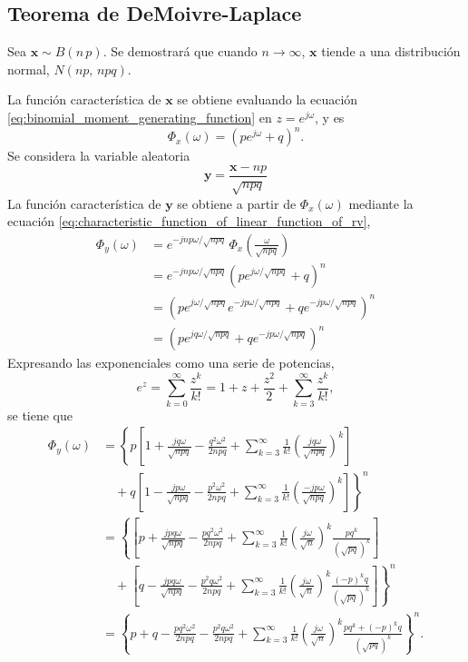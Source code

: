 \documentclass[a4paper]{report}
\newcommand{\x}{\mathbf{x}}
\newcommand{\y}{\mathbf{y}}
\begin{document}
\subsection{Teorema de DeMoivre-Laplace}

Sea \(\x\sim B(n\,p)\). Se demostrará que cuando \(n\to\infty\), \(\x\) tiende a una distribución normal, \(N(np,\,npq)\).

La función característica de \(\x\) se obtiene evaluando la ecuación \ref{eq:binomial_moment_generating_function} en \(z=e^{j\omega}\), y es
\[
 \Phi_x(\omega)=\left(pe^{j\omega}+q\right)^n.
\]
Se considera la variable aleatoria
\[
 \y=\frac{\x-np}{\sqrt{npq}}
\]
La función característica de \(\y\) se obtiene a partir de \(\Phi_x(\omega)\) mediante la ecuación \ref{eq:characteristic_function_of_linear_function_of_rv},
\begin{align*}
 \Phi_y(\omega)&=e^{-jnp\omega/\sqrt{npq}}\,\Phi_x\left(\frac{\omega}{\sqrt{npq}}\right)\\
   &=e^{-jnp\omega/\sqrt{npq}}\left(pe^{j\omega/\sqrt{npq}}+q\right)^n\\
   &=\left(pe^{j\omega/\sqrt{npq}}e^{-jp\omega/\sqrt{npq}}+qe^{-jp\omega/\sqrt{npq}}\right)^n\\
   &=\left(pe^{jq\omega/\sqrt{npq}}+qe^{-jp\omega/\sqrt{npq}}\right)^n
\end{align*}
Expresando las exponenciales como una serie de potencias, 
\[
 e^z=\sum_{k=0}^{\infty}\frac{z^{k}}{k!}=1+z+\frac{z^2}{2}+\sum_{k=3}^{\infty}\frac{z^{k}}{k!},
\]
se tiene que
\begin{align*}
 \Phi_y(\omega)&=\left\{p\left[1+\frac{jq\omega}{\sqrt{npq}}-\frac{q^2\omega^2}{2npq}+\sum_{k=3}^{\infty }\frac{1}{k!}\left(\frac{jq\omega}{\sqrt{npq}}\right)^k\right]\right.\\
   &\quad+\left. q\left[1-\frac{jp\omega}{\sqrt{npq}}-\frac{p^2\omega^2}{2npq}+\sum_{k=3}^{\infty }\frac{1}{k!}\left(\frac{-jp\omega}{\sqrt{npq}}\right)^k\right]\right\}^n\\
 &=\left\{\left[p+\frac{jpq\omega}{\sqrt{npq}}-\frac{pq^2\omega^2}{2npq}
  +\sum_{k=3}^{\infty }\frac{1}{k!}\left(\frac{j\omega}{\sqrt{n}}\right)^k\frac{pq^k}{\left(\sqrt{pq}\right)^k}\right]\right.\\
   &\quad+\left. \left[q-\frac{jpq\omega}{\sqrt{npq}}-\frac{p^2q\omega^2}{2npq} 
  +\sum_{k=3}^{\infty }\frac{1}{k!}\left(\frac{j\omega}{\sqrt{n}}\right)^k\frac{(-p)^kq}{\left(\sqrt{pq}\right)^k}\right]\right\}^n\\
 &=\left\{p+q-\frac{pq^2\omega^2}{2npq}-\frac{p^2q\omega^2}{2npq}
  +\sum_{k=3}^{\infty }\frac{1}{k!}\left(\frac{j\omega}{\sqrt{n}}\right)^k
  \frac{pq^k+(-p)^kq}{\left(\sqrt{pq}\right)^k}\right\}^n.
\end{align*}
\end{document}
